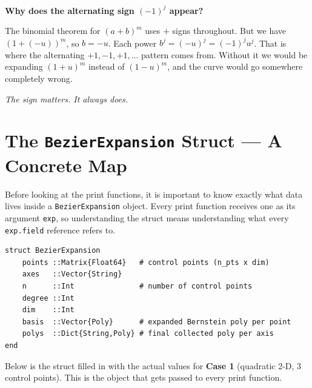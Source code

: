 \documentclass[12pt, a4paper]{article}
\newcommand{\cd}[1]{\texttt{#1}}
\begin{document}
\begin{notebox}
\textbf{Why does the alternating sign $(-1)^j$ appear?}

The binomial theorem for $(a + b)^m$ uses $+$ signs throughout.
But we have $(1 + (-u))^m$, so $b = -u$.
Each power $b^j = (-u)^j = (-1)^j u^j$.
That is where the alternating $+1, -1, +1, \ldots$ pattern comes from.
Without it we would be expanding $(1+u)^m$ instead of $(1-u)^m$,
and the curve would go somewhere completely wrong.

\textit{The sign matters. It always does.}
\end{notebox}

\section{The \texttt{BezierExpansion} Struct --- A Concrete Map}

Before looking at the print functions, it is important to know
exactly what data lives inside a \cd{BezierExpansion} object.
Every print function receives one as its argument \cd{exp},
so understanding the struct means understanding what every
\cd{exp.field} reference refers to.

\begin{verbatim}
struct BezierExpansion
    points ::Matrix{Float64}   # control points (n_pts x dim)
    axes   ::Vector{String}
    n      ::Int               # number of control points
    degree ::Int
    dim    ::Int
    basis  ::Vector{Poly}      # expanded Bernstein poly per point
    polys  ::Dict{String,Poly} # final collected poly per axis
end
\end{verbatim}

Below is the struct filled in with the actual values for
\textbf{Case 1} (quadratic 2-D, 3 control points).
This is the object that gets passed to every print function.
\end{document}
